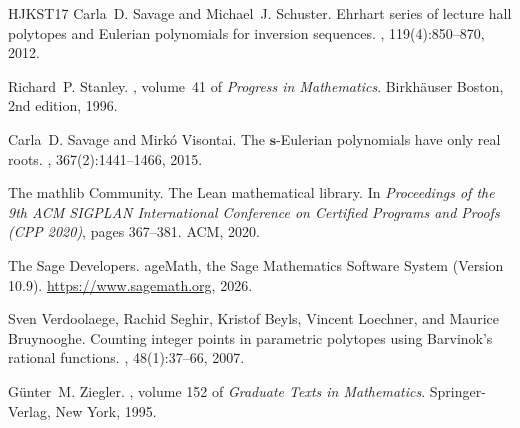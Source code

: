 \documentclass[11pt, a4paper, abstract=yes]{scrartcl}
\theoremstyle{definition}
\theoremstyle{remark}
\theoremstyle{plain}
\theoremstyle{remark}
\theoremstyle{plain}
\begin{document}
\begin{thebibliography}{HJKST17}
Carla~D. Savage and Michael~J. Schuster.
\newblock Ehrhart series of lecture hall polytopes and {E}ulerian polynomials
  for inversion sequences.
, 119(4):850--870,
  2012.

Richard~P. Stanley.
, volume~41 of {\em
  Progress in Mathematics}.
\newblock Birkh{\"a}user Boston, 2nd edition, 1996.

Carla~D. Savage and Mirk{\'o} Visontai.
\newblock The \(\mathbf{s}\)-{E}ulerian polynomials have only real roots.
,
  367(2):1441--1466, 2015.

{The mathlib Community}.
\newblock The {L}ean mathematical library.
\newblock In {\em Proceedings of the 9th {ACM} {SIGPLAN} International
  Conference on Certified Programs and Proofs ({CPP} 2020)}, pages 367--381.
  ACM, 2020.

{The Sage Developers}.
age{M}ath, the {S}age {M}athematics {S}oftware {S}ystem ({V}ersion
  10.9).
\newblock \url{https://www.sagemath.org}, 2026.

Sven Verdoolaege, Rachid Seghir, Kristof Beyls, Vincent Loechner, and Maurice
  Bruynooghe.
\newblock Counting integer points in parametric polytopes using {B}arvinok's
  rational functions.
, 48(1):37--66, 2007.

G{\"u}nter~M. Ziegler.
, volume 152 of {\em Graduate Texts in
  Mathematics}.
\newblock Springer-Verlag, New York, 1995.

\end{thebibliography}
\end{document}
